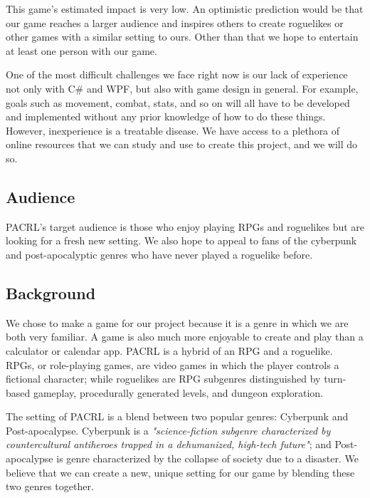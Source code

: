 \documentclass[10pt,conference,onecolumn,compsoc]{IEEEtran}
\begin{document}
This game's estimated impact is very low. An optimistic prediction would be that our game reaches a larger audience and inspires others to create roguelikes or other games with a similar setting to ours. Other than that we hope to entertain at least one person with our game.

One of the most difficult challenges we face right now is our lack of experience not only with C\# and WPF, but also with game design in general. For example, goals such as movement, combat, stats, and so on will all have to be developed and implemented without any prior knowledge of how to do these things. However, inexperience is a treatable disease. We have access to a plethora of online resources that we can study and use to create this project, and we will do so. 


\subsection{Audience}
PACRL's target audience is those who enjoy playing RPGs and roguelikes but are looking for a fresh new setting. We also hope to appeal to fans of the cyberpunk and post-apocalyptic genres who have never played a roguelike before. 


\subsection{Background}
We chose to make a game for our project because it is a genre in which we are both very familiar. A game is also much more enjoyable to create and play than a calculator or calendar app. PACRL is a hybrid of an RPG and a roguelike. RPGs, or role-playing games, are video games in which the player controls a fictional character; while roguelikes are RPG subgenres distinguished by turn-based gameplay, procedurally generated levels, and dungeon exploration. 

The setting of PACRL is a blend between two popular genres: Cyberpunk and Post-apocalypse.  Cyberpunk is a \emph{"science-fiction subgenre characterized by countercultural antiheroes trapped in a dehumanized, high-tech future"}\cite{IEEEhowto:cyberpunk}; and Post-apocalypse is genre characterized by the collapse of society due to a disaster. We believe that we can create a new, unique setting for our game by blending these two genres together.
\end{document}
